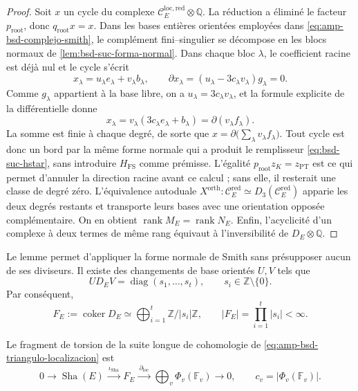 \begin{proof}
Soit \(x\) un cycle du complexe
\(\mathcal C_E^{\mathrm{loc,red}}\otimes\mathbb Q\). La réduction a
éliminé le facteur \(p_{\mathrm{root}}\), donc
\(q_{\mathrm{root}}x=x\). Dans les bases entières orientées employées dans
\eqref{eq:amp-bsd-complejo-smith}, le complément fini--singulier se
décompose en les blocs normaux de
\cref{lem:bsd-suc-forma-normal}. Dans chaque bloc \(\lambda\), le coefficient
racine est déjà nul et le cycle s'écrit
\[
 x_{\lambda}=u_{\lambda}e_{\lambda}
                  +v_{\lambda}b_{\lambda},
 \qquad
 \partial x_{\lambda}
   =(u_{\lambda}-3c_{\lambda}v_{\lambda})g_{\lambda}=0.
\]
Comme \(g_{\lambda}\) appartient à la base libre, on a
\(u_{\lambda}=3c_{\lambda}v_{\lambda}\), et la formule explicite de la
différentielle donne
\[
 x_{\lambda}
   =v_{\lambda}(3c_{\lambda}e_{\lambda}+b_{\lambda})
   =\partial(v_{\lambda}f_{\lambda}).
\]
La somme est finie à chaque degré, de sorte que
\(x=\partial\bigl(\sum_{\lambda}v_{\lambda}f_{\lambda}\bigr)\).
Tout cycle est donc un bord par la même forme normale qui a produit
le remplisseur \eqref{eq:bsd-suc-hstar}, sans introduire
\(H_{\mathrm{FS}}\) comme prémisse. L'égalité
\(p_{\mathrm{root}}z_K=z_{\mathrm{PT}}\) est ce qui permet d'annuler la
direction racine avant ce calcul ; sans elle, il resterait une classe de degré
zéro. L'équivalence autoduale
\(X^{\mathrm{orth}}:\mathcal C_E^{\mathrm{red}}\simeq
D_3(\mathcal C_E^{\mathrm{red}})\) apparie les deux degrés restants et
transporte leurs bases avec une orientation opposée complémentaire. On en
obtient \(\operatorname{rank}M_E=\operatorname{rank}N_E\).
Enfin, l'acyclicité d'un complexe à deux termes de même rang
équivaut à l'inversibilité de \(D_E\otimes\mathbb Q\).
\end{proof}

Le lemme permet d'appliquer la forme normale de Smith sans présupposer aucun de
ses diviseurs. Il existe des changements de base orientés \(U,V\) tels que
\begin{equation}\label{eq:amp-bsd-morfismo-smith}
 U D_E V=\operatorname{diag}(s_1,\ldots,s_t),
 \qquad s_i\in\mathbb Z\setminus\{0\}.
\end{equation}
Par conséquent,
\begin{equation}\label{eq:amp-bsd-grupo-smith}
 F_E:=\operatorname{coker}D_E
 \simeq\bigoplus_{i=1}^{t}\mathbb Z/|s_i|\mathbb Z,
 \qquad
 |F_E|=\prod_{i=1}^{t}|s_i|<\infty.
\end{equation}

\begin{lemma}
\label{lem:amp-bsd-exactitud-sha-tamagawa}
Le fragment de torsion de la suite longue de cohomologie de
\eqref{eq:amp-bsd-triangulo-localizacion} est
\begin{equation}\label{eq:amp-bsd-exacta-sha-tamagawa}
 0\longrightarrow\operatorname{Sha}(E)
 \xrightarrow{\ \iota_{\mathrm{Sha}}\ }F_E
 \xrightarrow{\ \partial_{\mathrm{loc}}\ }
 \bigoplus_v\Phi_v(\mathbb F_v)
 \longrightarrow0,
 \qquad c_v=|\Phi_v(\mathbb F_v)|.
\end{equation}
\end{lemma}

